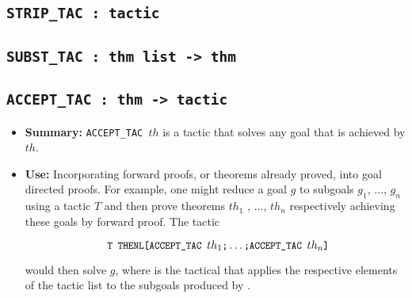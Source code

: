 \subsection{\tt STRIP\_TAC : tactic}


\subsection{\tt SUBST\_TAC : thm list -> thm}



\subsection{\tt ACCEPT\_TAC : thm -> tactic}\label{ACCEPTTAC}


\begin{itemize}

\item{\bf Summary:} {\small\verb|ACCEPT_TAC |}$th$
is a tactic that solves any goal that is
achieved by $th$.

\item{\bf  Use:} Incorporating forward proofs, or theorems already
proved, into goal directed proofs.
For example, one might reduce a goal $g$ to
subgoals $g_1$, $\dots$, $g_n$
using a tactic $T$ and then prove theorems $th_1$ , $\dots$, $th_n$
respectively achieving
these goals by forward proof. The tactic

\[\ml{  T THENL[ACCEPT\_TAC }th_1\ml{;}\ldots\ml{;ACCEPT\_TAC }th_n\ml{]}
\]

would then solve $g$, where 
 is the tactical that applies
the respective elements of the tactic list to the subgoals produced
by .

\end{itemize}



